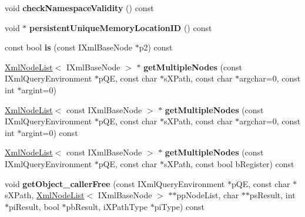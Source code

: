 \begin{DoxyCompactItemize}
\item 
\hypertarget{classgeneral__server_1_1LibXmlBaseNode_abadf65f15a56feaae6e5d3658f0b1e41}{void {\bfseries check\-Namespace\-Validity} () const }\label{classgeneral__server_1_1LibXmlBaseNode_abadf65f15a56feaae6e5d3658f0b1e41}

\item 
\hypertarget{classgeneral__server_1_1LibXmlBaseNode_a8c50514d9926ab5f00d9331d8b7f7455}{void $\ast$ {\bfseries persistent\-Unique\-Memory\-Location\-I\-D} () const }\label{classgeneral__server_1_1LibXmlBaseNode_a8c50514d9926ab5f00d9331d8b7f7455}

\item 
\hypertarget{classgeneral__server_1_1LibXmlBaseNode_a43c2b663944f9d81ed7e5c9670a7d23f}{const bool {\bfseries is} (const \-I\-Xml\-Base\-Node $\ast$p2) const }\label{classgeneral__server_1_1LibXmlBaseNode_a43c2b663944f9d81ed7e5c9670a7d23f}

\item 
\hypertarget{classgeneral__server_1_1LibXmlBaseNode_a9b1e990c93f6e4123459896f45aaa311}{\hyperlink{classgeneral__server_1_1XmlNodeList}{\-Xml\-Node\-List}$<$ \-I\-Xml\-Base\-Node $>$ $\ast$ {\bfseries get\-Multiple\-Nodes} (const \-I\-Xml\-Query\-Environment $\ast$p\-Q\-E, const char $\ast$s\-X\-Path, const char $\ast$argchar=0, const int $\ast$argint=0)}\label{classgeneral__server_1_1LibXmlBaseNode_a9b1e990c93f6e4123459896f45aaa311}

\item 
\hypertarget{classgeneral__server_1_1LibXmlBaseNode_a34316cd65479e50f6c5b265d6140f268}{\hyperlink{classgeneral__server_1_1XmlNodeList}{\-Xml\-Node\-List}$<$ const \-I\-Xml\-Base\-Node $>$ $\ast$ {\bfseries get\-Multiple\-Nodes} (const \-I\-Xml\-Query\-Environment $\ast$p\-Q\-E, const char $\ast$s\-X\-Path, const char $\ast$argchar=0, const int $\ast$argint=0) const }\label{classgeneral__server_1_1LibXmlBaseNode_a34316cd65479e50f6c5b265d6140f268}

\item 
\hypertarget{classgeneral__server_1_1LibXmlBaseNode_a5134ae011f57f80e39768f03fbfb138b}{\hyperlink{classgeneral__server_1_1XmlNodeList}{\-Xml\-Node\-List}$<$ const \-I\-Xml\-Base\-Node $>$ $\ast$ {\bfseries get\-Multiple\-Nodes} (const \-I\-Xml\-Query\-Environment $\ast$p\-Q\-E, const char $\ast$s\-X\-Path, const bool b\-Register) const }\label{classgeneral__server_1_1LibXmlBaseNode_a5134ae011f57f80e39768f03fbfb138b}

\item 
\hypertarget{classgeneral__server_1_1LibXmlBaseNode_a3fad7ba2358677ec3a52593ec5c3d819}{void {\bfseries get\-Object\-\_\-caller\-Free} (const \-I\-Xml\-Query\-Environment $\ast$p\-Q\-E, const char $\ast$s\-X\-Path, \hyperlink{classgeneral__server_1_1XmlNodeList}{\-Xml\-Node\-List}$<$ \-I\-Xml\-Base\-Node $>$ $\ast$$\ast$pp\-Node\-List, char $\ast$$\ast$ps\-Result, int $\ast$pi\-Result, bool $\ast$pb\-Result, i\-X\-Path\-Type $\ast$pi\-Type) const }\label{classgeneral__server_1_1LibXmlBaseNode_a3fad7ba2358677ec3a52593ec5c3d819}


\end{DoxyCompactItemize}

